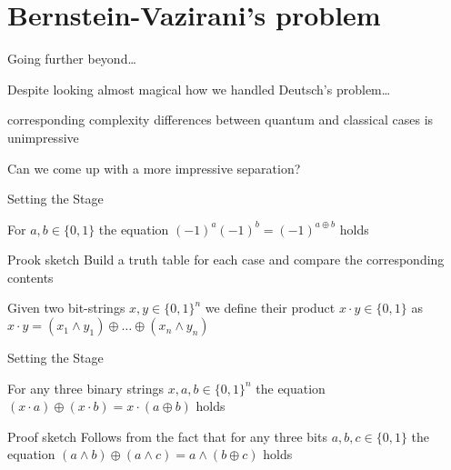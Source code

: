 \documentclass{beamer}
\begin{document}
\section{Bernstein-Vazirani's problem}

\begin{frame}{Going further beyond\dots}

        Despite looking almost magical how we handled Deutsch's problem\dots

        corresponding complexity differences between quantum and classical
        cases is \alert{unimpressive}
        
        Can we come up with a more impressive separation?
\end{frame}

\begin{frame}{Setting the Stage}
        \begin{lemma}
                For $a,b \in \{0,1\}$ the equation $(-1)^a(-1)^b = (-1)^{a \oplus b}$
                holds
        \end{lemma}
        \begin{block}{Prook sketch}
                Build a truth table for each case and compare the corresponding
                contents
        \end{block}

        \vfill
        \begin{definition}
                Given two bit-strings $x,y \in \{0,1\}^n$ we define
                their product $x \cdot y \in \{0,1\}$ as
                        $x \cdot y = (x_1 \wedge y_1) \oplus \dots
                        \oplus (x_n \wedge y_n)$
        \end{definition}
\end{frame}

\begin{frame}{Setting the Stage}

        \begin{lemma}
                For any three binary strings $x,a,b \in \{0,1\}^n$ the equation
                $(x \cdot a) \oplus (x \cdot b) = x \cdot (a \oplus b)$ holds
        \end{lemma}

        \begin{block}{Proof sketch} 
                Follows from the fact that for any three bits $a,b,c \in
                \{0,1\}$ the equation $(a \wedge b) \oplus (a \wedge c) = a
                \wedge (b \oplus c)$ holds
        \end{block}
\end{frame}
\end{document}
